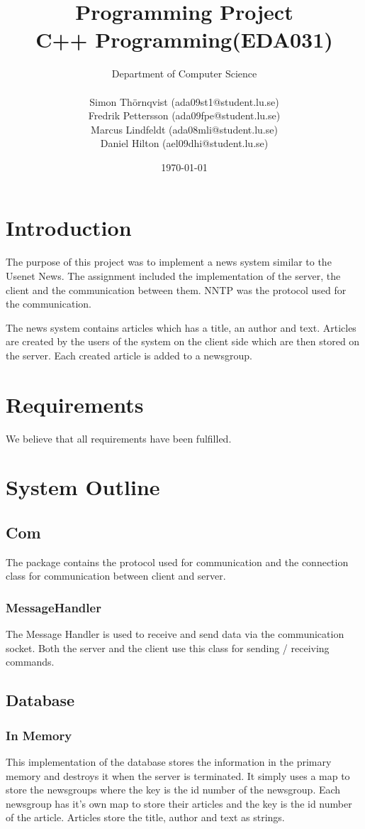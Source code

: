 \documentclass[a4paper, titlepage]{article}
\title{
    Programming Project \\
    C++ Programming(EDA031)
}
\author{
		Department of Computer Science
		\\
		\\
        Simon Thörnqvist (ada09st1@student.lu.se)
        	\\
        Fredrik Pettersson (ada09fpe@student.lu.se)
        \\
        Marcus Lindfeldt (ada08mli@student.lu.se)
        \\
        Daniel Hilton (ael09dhi@student.lu.se)
}
\date{\today}
\begin{document}
\maketitle

\section{Introduction}\label{introduction}
The purpose of this project was to implement a news system similar to the Usenet News. The assignment included the implementation of the server, the client and the communication between them. NNTP was the protocol used for the communication.

The news system contains articles which has a title, an author and text. Articles are created by the users of the system on the client side which are then stored on the server. Each created article is added to a newsgroup.

\section{Requirements}\label{requirements}
We believe that all requirements have been fulfilled.

\section{System Outline}\label{systemoutline}

\subsection{Com}
The package contains the protocol used for communication and the connection class for communication between client and server.

\subsubsection{MessageHandler}
The Message Handler is used to receive and send data via the communication socket. Both the server and the client use this class for sending / receiving commands.

\subsection{Database}

\subsubsection{In Memory}
This implementation of the database stores the information in the primary memory and destroys it when the server is terminated. It simply uses a map to store the newsgroups where the key is the id number of the newsgroup. Each newsgroup has it's own map to store their articles and the key is the id number of the article. Articles store the title, author and text as strings.
\end{document}
